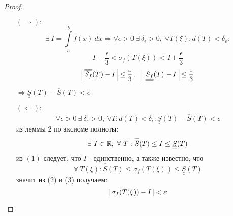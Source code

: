 \begin{proof} \ 
    \begin{itemize}
        \item[$(\Rightarrow):$]
        \[\exists\ I=\int\limits_{a}^{b}f(x)\ dx \Rightarrow \forall \epsilon>0\ \exists\ \delta_{\epsilon}>0,\ \forall T(\xi): d(T)<\delta_{\epsilon}:\]
        \[I-\frac{\epsilon}{3}<\sigma_f(T(\xi))<I+\frac{\epsilon}{3}\]
        \[\vline\ \overline{\overline{S_f}}(T)-I\ \vline \leq \frac{\epsilon}{3},\ \ \  \vline\ \underline{\underline{S_f}}(T)-I\ \vline \leq \frac{\epsilon}{3}\]
        $\Rightarrow \underline{\underline{S}}(T)-\overline{\overline{S}}(T)<\epsilon$.
        \item[$(\Leftarrow):$]
        \begin{equation}
            \forall \epsilon>0\ \exists\ \delta_{\epsilon}>0,\ \forall T: d(T)<\delta_{\epsilon}: \underline{\underline{S}}(T)-\overline{\overline{S}}(T)<\epsilon
        \end{equation}
        из леммы 2 по аксиоме полноты: 
        \begin{equation}
            \exists\ I\in \R,\ \forall\ T: \overline{\overline{S}}(T)\leq I\leq\underline{\underline{S}}(T)
        \end{equation}
        из $(1)$ следует, что $I$ - единственно, а также известно, что
        \begin{equation}
            \forall\ T(\xi): \overline{\overline{S}}(T)\leq \sigma_f(T(\xi))\leq \underline{\underline{S}}(T)
        \end{equation}
        значит из (2) и (3) получаем:
        \[\vline\ \sigma_f(T(\xi))-I \ \vline<\epsilon\]    
    \end{itemize}
\end{proof} 
